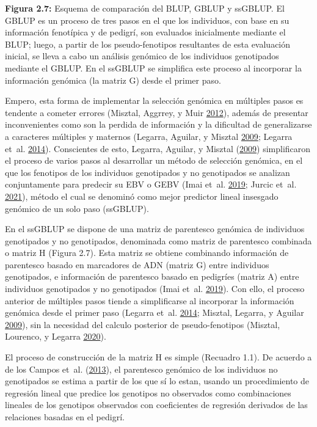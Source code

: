 \documentclass[11pt,spanish,a4paper,oneside,]{book} %
\begin{document}
\begin{center}
\textbf{Figura 2.7:} Esquema de comparación del BLUP, GBLUP y ssGBLUP. El GBLUP es un proceso de tres pasos en el que los individuos, con base en su información fenotípica y de pedigrí, son evaluados inicialmente mediante el BLUP; luego, a partir de los pseudo-fenotipos resultantes de esta evaluación inicial, se lleva a cabo un análisis genómico de los individuos genotipados mediante el GBLUP. En el ssGBLUP se simplifica este proceso al incorporar la información genómica (la matriz G) desde el primer paso.

\end{center}

Empero, esta forma de implementar la selección genómica en múltiples pasos es tendente a cometer errores (Misztal, Aggrrey, y Muir \protect\hyperlink{ref-cite:14}{2012}), además de presentar inconvenientes como son la perdida de información y la dificultad de generalizarse a caracteres múltiples y maternos (Legarra, Aguilar, y Misztal \protect\hyperlink{ref-cite:17}{2009}; Legarra et~al. \protect\hyperlink{ref-cite:15}{2014}). Conscientes de esto, Legarra, Aguilar, y Misztal (\protect\hyperlink{ref-cite:17}{2009}) simplificaron el proceso de varios pasos al desarrollar un método de selección genómica, en el que los fenotipos de los individuos genotipados y no genotipados se analizan conjuntamente para predecir su EBV o GEBV (Imai et~al. \protect\hyperlink{ref-cite:20}{2019}; Jurcic et~al. \protect\hyperlink{ref-cite:11}{2021}), método el cual se denominó como mejor predictor lineal insesgado genómico de un solo paso (ssGBLUP).

En el ssGBLUP se dispone de una matriz de parentesco genómica de individuos genotipados y no genotipados, denominada como matriz de parentesco combinada o matriz H (Figura 2.7). Esta matriz se obtiene combinando información de parentesco basado en marcadores de ADN (matriz G) entre individuos genotipados, e información de parentesco basado en pedigríes (matriz A) entre individuos genotipados y no genotipados (Imai et~al. \protect\hyperlink{ref-cite:20}{2019}). Con ello, el proceso anterior de múltiples pasos tiende a simplificarse al incorporar la información genómica desde el primer paso (Legarra et~al. \protect\hyperlink{ref-cite:15}{2014}; Misztal, Legarra, y Aguilar \protect\hyperlink{ref-cite:16}{2009}), sin la necesidad del calculo posterior de pseudo-fenotipos (Misztal, Lourenco, y Legarra \protect\hyperlink{ref-cite:18}{2020}).

El proceso de construcción de la matriz H es simple (Recuadro 1.1). De acuerdo a de los Campos et~al. (\protect\hyperlink{ref-cite:31}{2013}), el parentesco genómico de los individuos no genotipados se estima a partir de los que sí lo estan, usando un procedimiento de regresión lineal que predice los genotipos no observados como combinaciones lineales de los genotipos observados con coeficientes de regresión derivados de las relaciones basadas en el pedigrí.
\end{document}
